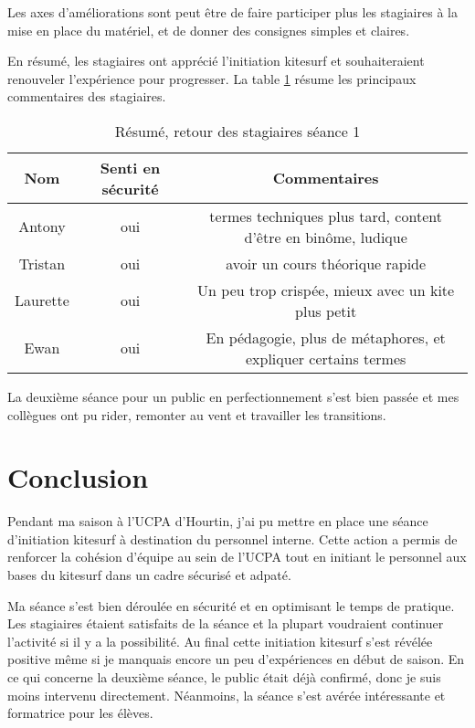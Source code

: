 \documentclass[11pt,a4paper]{report}
\begin{document}
Les axes d'améliorations sont peut \^etre de faire participer
plus les stagiaires à la mise en place du matériel, et de
donner des consignes simples et claires. 

En résumé, les stagiaires ont apprécié l'initiation kitesurf et
souhaiteraient renouveler l'expérience pour progresser. La table
\ref{stagiaire_feedback} résume les principaux commentaires des stagiaires.

\begin{table}[h]
\begin{tabular}{|c|c|c|}
        \hline
        \textbf{Nom} & \textbf{Senti en sécurité} & \textbf{Commentaires} \\ 
        \hline
       Antony      &  oui    &   termes techniques plus tard, content d’être en binôme, ludique         \\
       \hline
       Tristan     &  oui    & avoir un cours théorique rapide  \\
       \hline
        Laurette   &  oui    & Un peu trop crispée, mieux avec un kite plus petit \\
        \hline
        Ewan       &  oui    & En pédagogie, plus de métaphores, et expliquer certains termes\\
        \hline
\end{tabular}
\caption{Résumé, retour des stagiaires séance 1\label{stagiaire_feedback}}
\end{table}

La deuxième séance pour un public en perfectionnement s'est bien passée et 
mes collègues ont pu rider, remonter au vent et travailler les transitions.



\FloatBarrier
\section{Conclusion}

Pendant ma saison à l'UCPA d'Hourtin, j'ai pu mettre en place une 
séance d'initiation kitesurf à destination du personnel interne.
Cette action a permis de renforcer la cohésion d'équipe au sein de l'UCPA
tout en initiant le personnel aux bases du kitesurf dans un cadre 
sécurisé et adpaté.

Ma séance s'est bien déroulée en sécurité et en optimisant 
le temps de pratique. Les stagiaires étaient  satisfaits de la 
séance et la plupart voudraient continuer l'activité si il 
y a la possibilité.
Au final cette initiation kitesurf s'est révélée  positive m\^eme si
je manquais encore un peu d'expériences en début de saison.
En ce qui concerne la deuxième séance, le public était déjà confirmé, 
donc je suis moins intervenu directement. Néanmoins, la séance s'est avérée
intéressante et formatrice pour les élèves.
\end{document}
